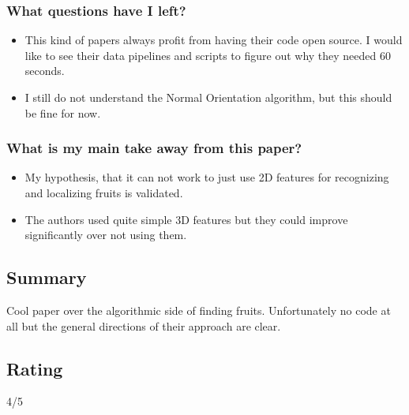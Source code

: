 \subsubsection*{What questions have I left?}
\begin{itemize}
    \item This kind of papers always profit from having their code open source. I would like to see their data pipelines and scripts to figure out why they needed 60 seconds.
    \item I still do not understand the Normal Orientation algorithm, but this should be fine for now.
\end{itemize}
\subsubsection*{What is my main take away from this paper?}
\begin{itemize}
    \item My hypothesis, that it can not work to just use 2D features for recognizing and localizing fruits is validated.\
    \item The  authors used quite simple 3D features but they could improve significantly over not using them. 
\end{itemize}

\subsection*{Summary}
Cool paper over the algorithmic side of finding fruits.  Unfortunately no code at all but the general directions of their approach are clear.

\subsection*{Rating}
4/5

